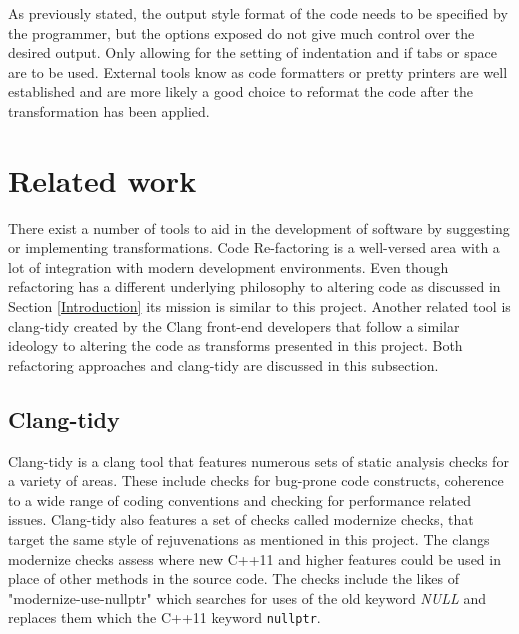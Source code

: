 \documentclass[bsc,frontabs,singlespacing,twoside,parskip,deptreport]{infthesis}
\begin{document}
As previously stated, the output style format of the code needs to be specified by the programmer, but the options exposed do not give much control over the desired output. Only allowing for the setting of indentation and if tabs or space are to be used. External tools know as code formatters or pretty printers are well established and are more likely a good choice to reformat the code after the transformation has been applied.

\section{Related work}
There exist a number of tools to aid in the development of software by suggesting or implementing transformations. Code Re-factoring \cite{REFACTOR} is a well-versed area with a lot of integration with modern development environments. Even though refactoring has a different underlying philosophy to altering code as discussed in Section \ref{Introduction} its mission is similar to this project. Another related tool is clang-tidy created by the Clang front-end developers that follow a similar ideology to altering the code as transforms presented in this project. Both refactoring approaches and clang-tidy are discussed in this subsection.

\subsection{Clang-tidy}\label{sec:rw-clang-tidy}
Clang-tidy \cite{CLANG_TIDY} is a clang tool that features numerous sets of static analysis checks for a variety of areas. These include checks for bug-prone code constructs, coherence to a wide range of coding conventions and checking for performance related issues. Clang-tidy also features a set of checks called modernize checks, that target the same style of rejuvenations as mentioned in this project. The clangs modernize checks assess where new C++11 and higher features could be used in place of other methods in the source code. The checks include the likes of "modernize-use-nullptr" which searches for uses of the old keyword \textit{NULL} and replaces them which the C++11 keyword \texttt{nullptr}.
\end{document}
